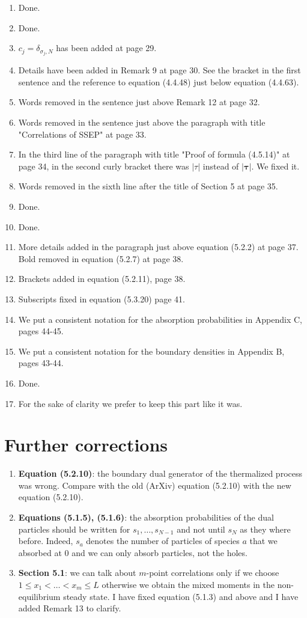\documentclass[10pt]{article}
\numberwithin{equation}{section}
\numberwithin{equation}{subsection}
\begin{document}
\begin{enumerate}
			\item Done.
			\item Done.
			\item $c_{j}=\delta_{\sigma_{j},N}$ has been added at page 29.
			\item Details have been added in Remark 9 at page 30. See the bracket in the first sentence and the reference to equation (4.4.48) just below equation (4.4.63).
			\item Words removed in the sentence just above Remark 12 at page 32. 
			\item Words removed in the sentence just above the paragraph with title "Correlations of SSEP" at page 33.
			\item In the third line of the paragraph with title "Proof of formula (4.5.14)" at page 34, in the second curly bracket there was $|\tau|$ instead of $|\bm{\tau}|$. We fixed it.
			\item Words removed in the sixth line after the title of Section 5 at page 35. 
			\item Done.
			\item Done.
			\item More details added in the paragraph just above equation (5.2.2) at page 37. Bold removed in equation (5.2.7) at page 38.
			\item Brackets added in equation (5.2.11), page 38.
			\item Subscripts fixed in equation (5.3.20) page 41.
			\item We put a consistent notation for the absorption probabilities in Appendix C, pages 44-45. 
			\item We put a consistent notation for the boundary densities in Appendix B, pages 43-44.
			\item Done.
			\item For the sake of clarity we prefer to keep this part like it was.
		\end{enumerate}
\section*{Further corrections}
\begin{enumerate}
\item \textbf{Equation (5.2.10)}: the boundary dual generator of the thermalized process was wrong. Compare with the old (ArXiv) equation (5.2.10) with the new equation (5.2.10).
\item \textbf{Equations (5.1.5), (5.1.6)}: the absorption probabilities of the dual particles should be written for $s_{1},\ldots,s_{N-1}$ and not until $s_{N}$ as they where before. Indeed, $s_{a}$ denotes the number of particles of species $a$ that we absorbed at $0$ and we can only absorb particles, not the holes. 
\item \textbf{Section 5.1}: we can talk about $m$-point correlations only if we choose $1\leq x_{1}<\ldots<x_{m}\leq L$ otherwise  we obtain the mixed moments in the non-equilibrium steady state. I have fixed equation (5.1.3) and above and I have added Remark 13 to clarify.
\end{enumerate}
	
\end{document}
